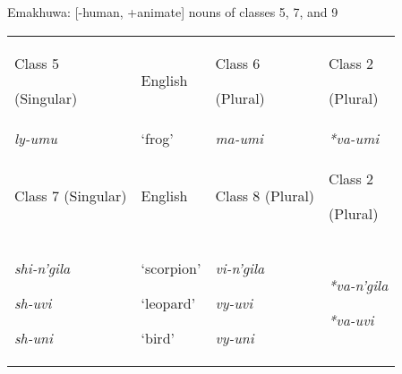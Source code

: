 \documentclass[output=paper]{langsci/langscibook}
\begin{document}
\begin{styleLangsciTableHeading}
Emakhuwa: [-human, +animate] nouns of classes 5, 7, and 9
\end{styleLangsciTableHeading}

\begin{tabularx}{\textwidth}{XXXX}
\lsptoprule

 Class 5\par

 (Singular)\par & English\par & Class 6\par

 (Plural)\par & Class 2\par

 (Plural)\par\\
 \textit{ly-umu}\par & ‘frog’\par & \textit{ma-umi}\par & \textit{*va-umi}\par\\
 Class 7 (Singular)\par & English\par & Class 8 (Plural)\par & Class 2\par

 (Plural)\par\\
 \textit{shi-n’gila}\par

 \textit{sh-uvi}\par

 \textit{sh-uni}\par & ‘scorpion’\par

 ‘leopard’\par

 ‘bird’\par & \textit{vi-n’gila}\par

 \textit{vy-uvi}\par

 \textit{vy-uni}\par & \textit{*va-n’gila}\par

 \textit{*va-uvi}\par


\end{tabularx}
\end{document}

